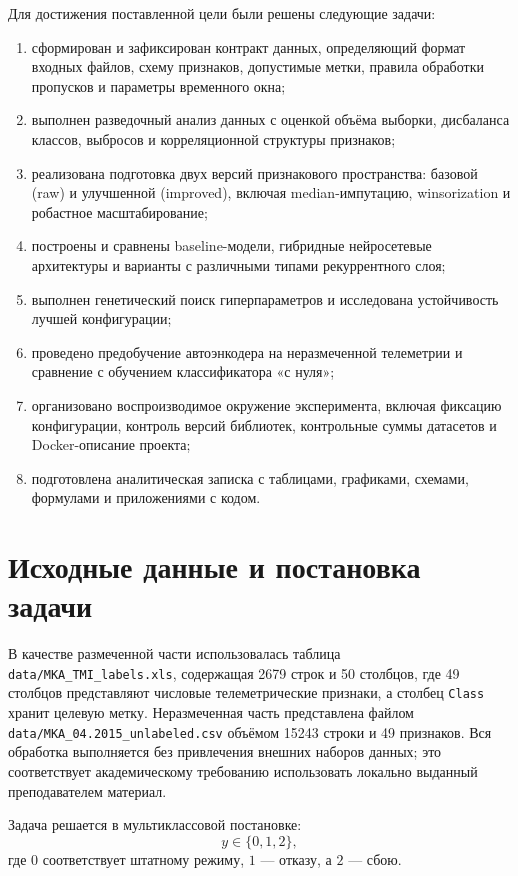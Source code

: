 \documentclass[14pt,a4paper]{extarticle}
\begin{document}
Для достижения поставленной цели были решены следующие задачи:
\begin{enumerate}
    \item сформирован и зафиксирован контракт данных, определяющий формат входных файлов, схему признаков, допустимые метки, правила обработки пропусков и параметры временного окна;
    \item выполнен разведочный анализ данных с оценкой объёма выборки, дисбаланса классов, выбросов и корреляционной структуры признаков;
    \item реализована подготовка двух версий признакового пространства: базовой (raw) и улучшенной (improved), включая median-импутацию, winsorization и робастное масштабирование;
    \item построены и сравнены baseline-модели, гибридные нейросетевые архитектуры и варианты с различными типами рекуррентного слоя;
    \item выполнен генетический поиск гиперпараметров и исследована устойчивость лучшей конфигурации;
    \item проведено предобучение автоэнкодера на неразмеченной телеметрии и сравнение с обучением классификатора «с нуля»;
    \item организовано воспроизводимое окружение эксперимента, включая фиксацию конфигурации, контроль версий библиотек, контрольные суммы датасетов и Docker-описание проекта;
    \item подготовлена аналитическая записка с таблицами, графиками, схемами, формулами и приложениями с кодом.
\end{enumerate}

\section{Исходные данные и постановка задачи}\label{sec:data}
В качестве размеченной части использовалась таблица \texttt{data/MKA\_TMI\_labels.xls}, содержащая 2679 строк и 50 столбцов, где 49 столбцов представляют числовые телеметрические признаки, а столбец \texttt{Class} хранит целевую метку. Неразмеченная часть представлена файлом \texttt{data/MKA\_04.2015\_unlabeled.csv} объёмом 15243 строки и 49 признаков. Вся обработка выполняется без привлечения внешних наборов данных; это соответствует академическому требованию использовать локально выданный преподавателем материал.

Задача решается в мультиклассовой постановке:
\begin{equation}
    y \in \{0,1,2\},
\end{equation}
где $0$ соответствует штатному режиму, $1$ --- отказу, а $2$ --- сбою.
\end{document}
